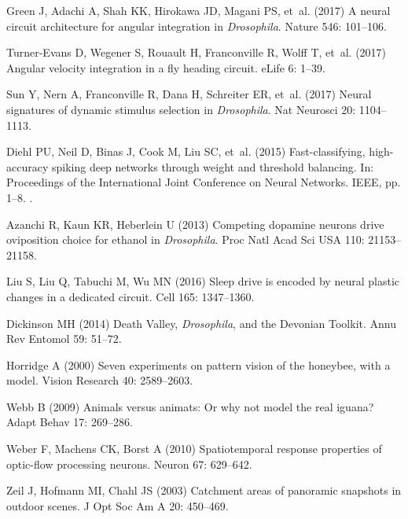 \begin{thebibliography}{10}
	Green J, Adachi A, Shah KK, Hirokawa JD, Magani PS, et~al. (2017) A neural
	circuit architecture for angular integration in \emph{Drosophila}.
	\newblock Nature 546: 101--106.
	
	Turner-Evans D, Wegener S, Rouault H, Franconville R, Wolff T, et~al. (2017)
	{Angular velocity integration in a fly heading circuit}.
	\newblock eLife 6: 1--39.
	
	Sun Y, Nern A, Franconville R, Dana H, Schreiter ER, et~al. (2017) Neural
	signatures of dynamic stimulus selection in \emph{Drosophila}.
	\newblock Nat Neurosci 20: 1104--1113.
	
	Diehl PU, Neil D, Binas J, Cook M, Liu SC, et~al. (2015) {Fast-classifying,
		high-accuracy spiking deep networks through weight and threshold balancing}.
	\newblock In: Proceedings of the International Joint Conference on Neural
	Networks. IEEE, pp. 1--8.
	\newblock {}.
	
	Azanchi R, Kaun KR, Heberlein U (2013) Competing dopamine neurons drive
	oviposition choice for ethanol in \emph{Drosophila}.
	\newblock Proc Natl Acad Sci USA 110: 21153--21158.
	
	Liu S, Liu Q, Tabuchi M, Wu MN (2016) Sleep drive is encoded by neural plastic
	changes in a dedicated circuit.
	\newblock Cell 165: 1347--1360.
	
	Dickinson MH (2014) {Death Valley, \emph{Drosophila}, and the Devonian
		Toolkit}.
	\newblock Annu Rev Entomol 59: 51--72.
	
	Horridge A (2000) {Seven experiments on pattern vision of the honeybee, with a
		model}.
	\newblock Vision Research 40: 2589--2603.
	
	Webb B (2009) Animals versus animats: {O}r why not model the real iguana?
	\newblock Adapt Behav 17: 269--286.
	
	Weber F, Machens CK, Borst A (2010) Spatiotemporal response properties of
	optic-flow processing neurons.
	\newblock Neuron 67: 629--642.
	
	Zeil J, Hofmann MI, Chahl JS (2003) Catchment areas of panoramic snapshots in
	outdoor scenes.
	\newblock J Opt Soc Am A 20: 450--469.
	

\end{thebibliography}
